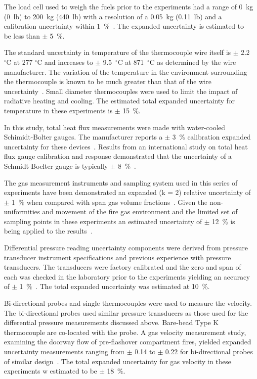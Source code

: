 \documentclass[12pt,oneside]{book}
\begin{document}
The load cell used to weigh the fuels prior to the experiments had a range of 0~kg (0~lb) to 200~kg (440~lb) with a resolution of a 0.05~kg (0.11~lb) and a calibration uncertainty within 1~\%~\cite{Ohaus:2000}. The expanded uncertainty is estimated to be less than $\pm$ 5~\%.

The standard uncertainty in temperature of the thermocouple wire itself is $\pm$ 2.2 $^{\circ}$C at 277 $^{\circ}$C and increases to $\pm$ 9.5~$^{\circ}$C at 871~$^{\circ}$C as determined by the wire manufacturer\cite{Omega:2004}. The variation of the temperature in the environment surrounding the thermocouple is known to be much greater than that of the wire uncertainty~\cite{Blevins:1999,Pitts:2003}. Small diameter thermocouples were used to limit the impact of radiative heating and cooling. The estimated total expanded uncertainty for temperature in these experiments is $\pm$ 15~\%.

In this study, total heat flux measurements were made with water-cooled Schimidt-Bolter gauges. The manufacturer reports a $\pm$ 3~\% calibration expanded uncertainty for these devices~\cite{Medtherm:2003}. Results from an international study on total heat flux gauge calibration and response demonstrated that the uncertainty of a Schmidt-Boelter gauge is typically $\pm$ 8~\%~\cite{Pitts:2006}.

The gas measurement instruments and sampling system used in this series of experiments have been demonstrated an expanded (k = 2) relative uncertainty of $\pm$ 1~\% when compared with span gas volume fractions~\cite{Bundy:2007}. Given the non-uniformities and movement of the fire gas environment and the limited set of sampling points in these experiments an estimated uncertainty of $\pm$ 12~\% is being applied to the results~\cite{Lock:1}.

Differential pressure reading uncertainty components were derived from pressure transducer instrument specifications and previous experience with pressure transducers. The transducers were factory calibrated and the zero and span of each was checked in the laboratory prior to the experiments yielding an accuracy of $\pm$ 1~\%~\cite{Setra:2002}. The total expanded uncertainty was estimated at 10~\%.

Bi-directional probes and single thermocouples were used to measure the velocity.  The bi-directional probes used similar pressure transducers as those used for the differential pressure measurements discussed above. Bare-bead Type K thermocouple are co-located with the probe. A gas velocity measurement study, examining the doorway flow of pre-flashover compartment fires, yielded expanded uncertainty measurements ranging from $\pm$ 0.14 to $\pm$ 0.22 for bi-directional probes of similar design~\cite{Bryant:FSJ2009}. The total expanded uncertainty for gas velocity in these experiments w estimated to be  $\pm$ 18~\%.
\end{document}
